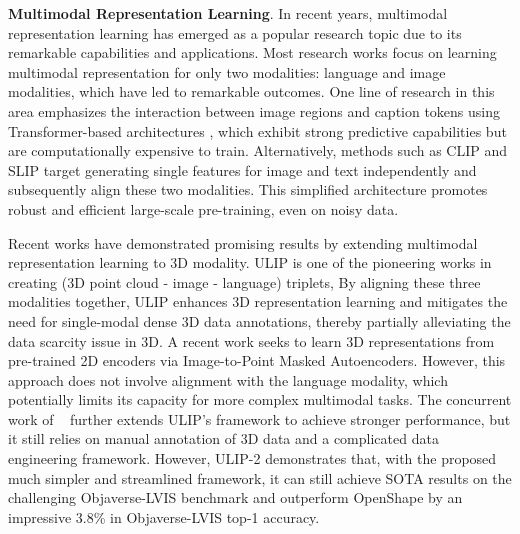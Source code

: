\documentclass[10pt,twocolumn,letterpaper]{article}
\newcommand{\ning}[1]{\textcolor{blue}{Ning: #1}}
\begin{document}
\noindent\textbf{Multimodal Representation Learning}. In recent years, multimodal representation learning has emerged as a popular research topic due to its remarkable capabilities and applications. Most research works focus on learning multimodal representation for only two modalities:  language and image modalities, which have led to remarkable outcomes. One line of research in this area emphasizes the interaction between image regions and caption tokens using Transformer-based architectures \cite{huang2021seeing,kim2021vilt,li2021align,zeng2021multi, panagopoulou2023x}, which exhibit strong predictive capabilities but are computationally expensive to train. Alternatively, methods such as CLIP \cite{radford2021learning} and SLIP \cite{mu2022slip} target generating single features for image and text independently and subsequently align these two modalities. This simplified architecture promotes robust and efficient large-scale pre-training, even on noisy data.


Recent works have demonstrated promising results by extending multimodal representation learning to 3D modality. ULIP \cite{xue2022ulip} is one of the pioneering works in creating (3D point cloud - image - language) triplets, By aligning these three modalities together, ULIP enhances 3D representation learning and mitigates the need for single-modal dense 3D data annotations, thereby partially alleviating the data scarcity issue in 3D.
A recent work \cite{zhang2022learning} seeks to learn 3D representations from pre-trained 2D encoders via Image-to-Point Masked Autoencoders. However, this approach does not involve alignment with the language modality, which potentially limits its capacity for more complex multimodal tasks.
The concurrent work of ~\citep{liu2023openshape} further extends ULIP's framework to achieve stronger performance, but it still relies on manual annotation of 3D data and a complicated data engineering framework. However, ULIP-2 demonstrates that, with the proposed much simpler and streamlined framework, it can still achieve SOTA results on the challenging Objaverse-LVIS benchmark and outperform OpenShape by an impressive 3.8\% in Objaverse-LVIS top-1 accuracy.
\end{document}
